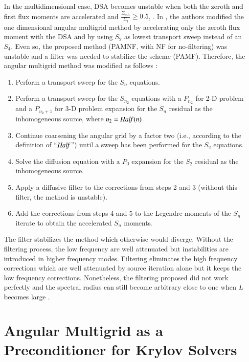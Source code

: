 \documentclass[preprint,10pt]{elsarticle}
\renewcommand{\(}{\left(}
\renewcommand{\)}{\right)}
\renewcommand{\[}{\left[}
\renewcommand{\]}{\right]}
\newcommand{\Half}{\text{\it Half\,}}
\begin{document}
In the multidimensional case, DSA becomes unstable when both the zeroth 
and first flux moments are accelerated and $\frac{\Sigma_{s,1}}{\Sigma_t}
\geq 0.5$, \cite{multisweep}. In \cite{multigrid_2d}, the authors modified the
one dimensional angular multigrid method by accelerating only the zeroth flux
moment with the DSA and by using $S_2$ as lowest transport sweep
instead of an $S_4$. Even so, the proposed method (PAMNF, with NF for no-filtering) 
was unstable and a filter was needed to stabilize the scheme (PAMF). Therefore, the angular 
multigrid method was modified as follows \cite{multigrid_2d} :
%
\begin{enumerate}
\item Perform a transport sweep for the $S_n$ equations.
\item Perform a transport sweep for the $S_{n_2}$ equations with a $P_{n_2}$
for 2-D problem and a $P_{n_2+1}$ for 3-D problem expansion for the $S_n$
residual as the inhomogeneous source, where $n_2=\Half(n)$.
\item Continue coarsening the angular grid by a factor two (i.e., according to the
definition of ``$\Half$'') until a sweep has been performed for the $S_2$
equations.
\item Solve the diffusion equation with a $P_0$ expansion for the $S_2$
residual as the inhomogeneous source. 
\item Apply a diffusive filter to the corrections from steps 2 and 3 (without
this filter, the method is unstable).
\item Add the corrections from steps 4 and 5 to the Legendre moments of the
$S_n$ iterate to obtain the accelerated $S_n$ moments.
\end{enumerate}
%
The filter stabilizes the method which otherwise would diverge. Without the
filtering process, the low frequency are well attenuated but instabilities are introduced
in higher frequency modes. Filtering eliminates the high frequency
corrections which are well attenuated by source iteration alone but it keeps
the low frequency corrections. Nonetheless, the filtering proposed did not work 
perfectly and the spectral radius can still become arbitrary close to one 
when $L$ becomes large \cite{multigrid_2d}.


\section{Angular Multigrid as a Preconditioner for Krylov Solvers} \label{sec:preconditioner}
\end{document}

